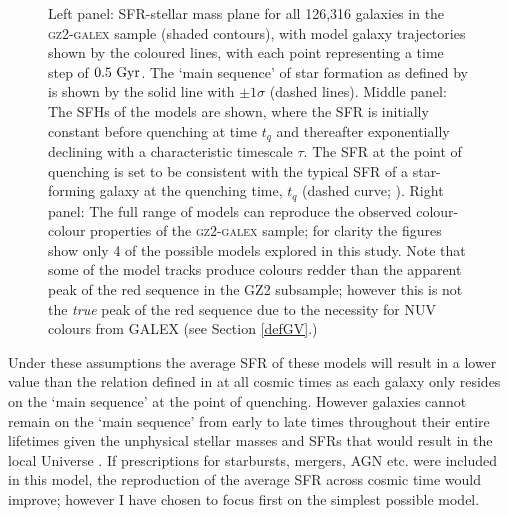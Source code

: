 \begin{figure}
\caption[SFH models in observational planes]{Left panel: SFR-stellar mass plane for all 126,316 galaxies in the \textsc{gz2-galex} sample (shaded contours), with model galaxy trajectories shown by the coloured lines, with each point representing a time step of $0.5~\rm{Gyr}$.  The `main sequence' of star formation as defined by \citet{peng10} is shown by the solid line with $\pm1\sigma$ (dashed lines). Middle panel: The SFHs of the models are shown, where the SFR is initially constant before quenching at time $t_q$ and thereafter exponentially declining with a characteristic timescale $\tau$. The SFR at the point of quenching is set to be consistent with the typical SFR of a star-forming galaxy at the quenching time, $t_q$ (dashed curve; \citealt{peng10}). Right panel: The full range of models can reproduce the observed colour-colour properties of the \textsc{gz2-galex} sample; for clarity the figures show only 4 of the possible models explored in this study. Note that some of the model tracks produce colours redder than the apparent peak of the red sequence in the GZ2 subsample; however this is not the \emph{true} peak of the red sequence due to the necessity for NUV colours from GALEX (see Section \ref{defGV}.)}
\label{sfr_mass_col}
\end{figure}
  
Under these assumptions the average SFR of these models will result in a lower value than the relation defined in \citet{peng10} at all cosmic times as each galaxy only resides on the `main sequence' at the point of quenching. However galaxies cannot remain on the `main sequence' from early to late times throughout their entire lifetimes given the unphysical stellar masses and SFRs that would result in the local Universe \citep{bethermin12, Heinis14}. If prescriptions for starbursts, mergers, AGN etc. were included in this model, the reproduction of the average SFR across cosmic time would improve; however I have chosen to focus first on the simplest possible model.

